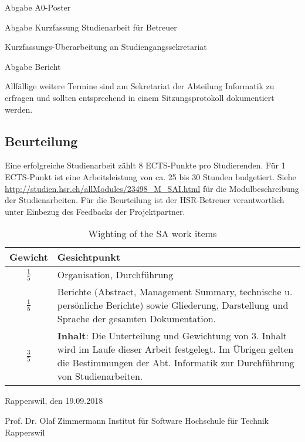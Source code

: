Abgabe A0-Poster

Abgabe Kurzfassung Studienarbeit für Betreuer

Kurzfassungs-Überarbeitung an Studiengangssekretariat

Abgabe Bericht

Allfällige weitere Termine sind am Sekretariat der Abteilung Informatik zu erfragen und sollten entsprechend in einem Sitzungsprotokoll dokumentiert werden. 
\subsection{Beurteilung}
Eine erfolgreiche Studienarbeit zählt 8 ECTS-Punkte pro Studierenden. Für 1 ECTS-Punkt ist eine Arbeitsleistung von ca. 25 bis 30 Stunden budgetiert. 
Siehe \url{http://studien.hsr.ch/allModules/23498_M_SAI.html} für die Modulbeschreibung der Studienarbeiten.
Für die Beurteilung ist der HSR-Betreuer verantwortlich unter Einbezug des Feedbacks der Projektpartner.

\begin{table}
    \begin{tabularx}{\textwidth}{|c|X|}
        \hline 
        Gewicht & Gesichtpunkt \\
        \hline 
        \( \frac{1}{5} \) & Organisation, Durchführung \\ 
        \hline 
        \( \frac{1}{5} \) &  Berichte (Abstract, Management Summary, technische u. persönliche Berichte) sowie Gliederung, Darstellung und Sprache der gesamten Dokumentation. \\ 
        \hline 
        \( \frac{3}{5} \) & \textbf{Inhalt}: Die Unterteilung und Gewichtung von 3. Inhalt wird im Laufe dieser Arbeit festgelegt.
        Im Übrigen gelten die Bestimmungen der Abt. Informatik zur Durchführung von Studienarbeiten.\\
        \hline 
    \end{tabularx}
    \caption{Wighting of the SA work items}
\end{table}

Rapperswil, den 19.09.2018

Prof. Dr. Olaf Zimmermann
Institut für Software
Hochschule für Technik Rapperswil